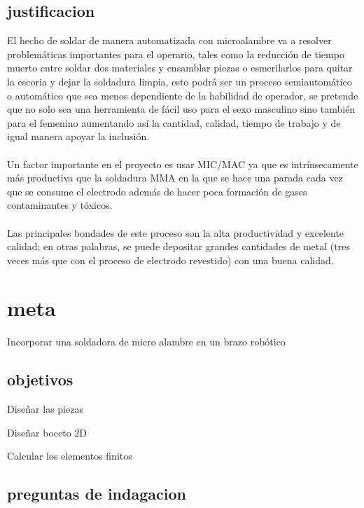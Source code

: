 \documentclass[12pt,letterpaper]{article}
\begin{document}
\newpage
\subsection*{justificacion}
El hecho de soldar de manera automatizada con microalambre va a resolver problemáticas importantes para el operario, tales como la reducción de tiempo muerto entre soldar dos materiales y ensamblar piezas o esmerilarlos para quitar la escoria y dejar la soldadura limpia, esto podrá ser un proceso semiautomático o automático que sea menos dependiente de la habilidad de operador, se pretende que no solo sea una herramienta de fácil uso para el sexo masculino sino también para el femenino aumentando así la cantidad, calidad, tiempo de trabajo y de igual manera  apoyar la inclusión.
\\\\
Un factor importante en el proyecto es usar MIC/MAC ya que es intrínsecamente más productiva que la soldadura MMA en la que se hace una parada cada vez que se consume el electrodo además de hacer poca formación de gases contaminantes y tóxicos.
\\\\
Las principales bondades de este proceso son la alta productividad y excelente calidad; en otras palabras, se puede depositar grandes cantidades de metal (tres veces más que con el proceso de electrodo revestido) con una buena calidad.


\section*{meta}
Incorporar una soldadora de micro alambre en un brazo robótico


\subsection*{objetivos}
\begin{flushleft}
Diseñar las piezas
\end{flushleft}
\begin{flushleft}
Diseñar boceto 2D
\end{flushleft}
\begin{flushleft}
Calcular los elementos finitos
\end{flushleft}

\subsection*{preguntas de indagacion}
\end{document}
